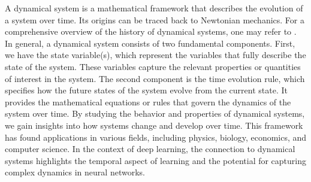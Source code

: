 \documentclass[nohyperref]{article}
\theoremstyle{plain}
\theoremstyle{definition}
\theoremstyle{remark}
\begin{document}
A dynamical system is a mathematical framework that describes the evolution of a system over time. Its origins can be traced back to Newtonian mechanics. For a comprehensive overview of the history of dynamical systems, one may refer to \cite{Holmes:2007}.
In general, a dynamical system consists of two fundamental components. First, we have the state variable(s), which represent the variables that fully describe the state of the system. These variables capture the relevant properties or quantities of interest in the system. The second component is the time evolution rule, which specifies how the future states of the system evolve from the current state. It provides the mathematical equations or rules that govern the dynamics of the system over time.
By studying the behavior and properties of dynamical systems, we gain insights into how systems change and develop over time. This framework has found applications in various fields, including physics, biology, economics, and computer science. In the context of deep learning, the connection to dynamical systems highlights the temporal aspect of learning and the potential for capturing complex dynamics in neural networks.
 
\end{document}
